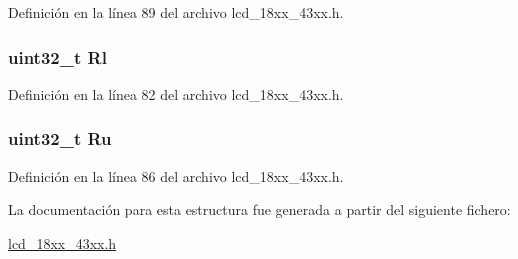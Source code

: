 Definición en la línea 89 del archivo lcd\+\_\+18xx\+\_\+43xx.\+h.

\subsubsection[{\texorpdfstring{Rl}{Rl}}]{\setlength{\rightskip}{0pt plus 5cm}uint32\+\_\+t Rl}\hypertarget{struct_l_c_d___p_a_l_e_t_t_e___e_n_t_r_y___t_a45ff0da2c14147cd867331fe71d2cb3e}{}\label{struct_l_c_d___p_a_l_e_t_t_e___e_n_t_r_y___t_a45ff0da2c14147cd867331fe71d2cb3e}


Definición en la línea 82 del archivo lcd\+\_\+18xx\+\_\+43xx.\+h.

\subsubsection[{\texorpdfstring{Ru}{Ru}}]{\setlength{\rightskip}{0pt plus 5cm}uint32\+\_\+t Ru}\hypertarget{struct_l_c_d___p_a_l_e_t_t_e___e_n_t_r_y___t_af589bfb5be8a0fd514d90788c5b3c839}{}\label{struct_l_c_d___p_a_l_e_t_t_e___e_n_t_r_y___t_af589bfb5be8a0fd514d90788c5b3c839}


Definición en la línea 86 del archivo lcd\+\_\+18xx\+\_\+43xx.\+h.



La documentación para esta estructura fue generada a partir del siguiente fichero\+:\begin{DoxyCompactItemize}
\item 
\hyperlink{lcd__18xx__43xx_8h}{lcd\+\_\+18xx\+\_\+43xx.\+h}\end{DoxyCompactItemize}
